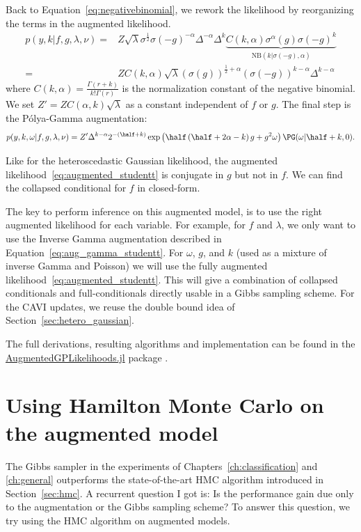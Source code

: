 Back to Equation~\eqref{eq:negativebinomial}, we rework the likelihood by reorganizing the terms in the augmented likelihood.
\begin{align*}
    p(y,k|f,g,\lambda,\nu) =& Z\sqrt{\lambda}\sigma^{\frac{1}{2}}\sigma(-g)^{-\alpha}\Delta^{-\alpha}\Delta^k\underbrace{C(k,\alpha)\sigma^{\alpha}(g)\sigma(-g)^k}_{\mathrm{NB}(k|\sigma(-g),\alpha)}\\
    =& ZC(k,\alpha)\sqrt{\lambda}(\sigma(g))^{\frac{1}{2}+\alpha}(\sigma(-g))^{k-\alpha}\Delta^{k-\alpha}
\end{align*}
where $C(k, \alpha) = \frac{\Gamma(r + k)}{k!\Gamma(r)}$ is the normalization constant of the negative binomial.
We set $Z'=ZC(\alpha,k)\sqrt{\lambda}$ as a constant independent of $f$ or $g$.
The final step is the P\'olya-Gamma augmentation:
\begin{align}
    p(y,k,\omega|f,g,\lambda,\nu) = Z'\Delta^{k-\alpha}2^{-(\half+k)}\exp\left(\half\left(\half + 2\alpha - k\right)g + g^2\omega\right)\PG(\omega|\half+k,0)\label{eq:augmented_studentt}.
\end{align}

Like for the heteroscedastic Gaussian likelihood, the augmented likelihood~\eqref{eq:augmented_studentt} is conjugate in $g$ but not in $f$.
We can find the collapsed conditional for $f$ in closed-form.

The key to perform inference on this augmented model, is to use the right augmented likelihood for each variable.
For example, for $f$ and $\lambda$, we only want to use the Inverse Gamma augmentation described in Equation~\eqref{eq:aug_gamma_studentt}.
For $\omega$, $g$, and $k$ (used as a mixture of inverse Gamma and Poisson) we will use the fully augmented likelihood~\eqref{eq:augmented_studentt}.
This will give a combination of collapsed conditionals and full-conditionals directly usable in a Gibbs sampling scheme.
For the \ac{CAVI} updates, we reuse the double bound idea of Section~\ref{sec:hetero_gaussian}.

The full derivations, resulting algorithms and implementation can be found in the  \href{https://github.com/JuliaGaussianProcesses/AugmentedGPLikelihoods.jl}{AugmentedGPLikelihoods.jl} package \cite{theo_galy_fajou_2022_6347022}.

\section{Using Hamilton Monte Carlo on the augmented model}

The Gibbs sampler in the experiments of Chapters~\ref{ch:classification} and \ref{ch:general} outperforms the state-of-the-art \ac{HMC} algorithm introduced in Section~\ref{sec:hmc}.
A recurrent question I got is:
Is the performance gain due only to the augmentation or the Gibbs sampling scheme?
To answer this question, we try using the \ac{HMC} algorithm on augmented models.

